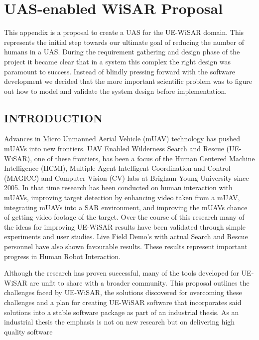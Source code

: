 \chapter{UAS-enabled WiSAR Proposal} \label{app:uas_wisar}

This appendix is a proposal to create a UAS for the UE-WiSAR domain.  This represents the initial step towards our ultimate goal of reducing the number of humans in a UAS.  During the requirement gathering and design phase of the project it became clear that in a system this complex the right design was paramount to success.  Instead of blindly pressing forward with the software development we decided that the more important scientific problem was to figure out how to model and validate the system design before implementation.  

\section{INTRODUCTION}
Advances in Micro Unmanned Aerial Vehicle (mUAV) technology has pushed mUAVs
into new frontiers.  UAV Enabled Wilderness Search and
Rescue (UE-WiSAR), one of these frontiers, has been a focus of the Human
Centered Machine Intelligence (HCMI), Multiple Agent Intelligent Coordination and Control (MAGICC) and Computer Vision (CV) labs at Brigham Young University since 2005.  In that time research has
been conducted on human interaction with mUAVs, improving target detection by
enhancing video taken from a mUAV, integrating mUAVs into a SAR environment,
and improving the mUAVs chance of getting video footage of the target.  Over
the course of this research many of the ideas for improving UE-WiSAR results
have been validated through simple experiments and user studies.  Live Field
Demo's with actual Search and Rescue personnel have also shown favourable
results. These results represent important progress in Human Robot Interaction. 

Although the research has proven successful, many of the tools developed for
UE-WiSAR are unfit to share with a broader community.  This proposal outlines
the challenges faced by UE-WiSAR, the solutions discovered for overcoming these
challenges and a plan for creating UE-WiSAR software that incorporates said
solutions into a stable software package as part of an industrial thesis.  As an
industrial thesis the emphasis is not on new research but on delivering high
quality software

